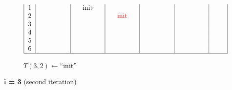 \begin{figure}[H]
\begin{subfigure}[t]{0.65\textwidth}
\[\begin{tabular}{|c|c|c|c|c|c|c|}
                                    1     &       & init  &                       &       &       &       \\
                                    2     &       &       & \textcolor{red}{init} &       &       &       \\
                                    3     &       &       &                       &       &       &       \\
                                    4     &       &       &                       &       &       &       \\
                                    5     &       &       &                       &       &       &       \\
                                    6 & \textcolor{white}{unpaired} & \textcolor{white}{unpaired} & \textcolor{white}{unpaired}
                                    & \textcolor{white}{unpaired}
                                    & \textcolor{white}{unpaired}
                                    & \textcolor{white}{init}
                                    \\ \hline
                        \end{tabular}
        \]
        \caption{$T(3,2) \gets \text{``init''}$ }
    \end{subfigure}
    \caption{\textbf{i = 3} (second iteration)}\label{fig:figure28}

\end{figure}

